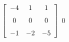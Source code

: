 {$\left[ \begin {array}{ccc} -4&1&1\\\noalign{\medskip}0&0&0
\\\noalign{\medskip}-1&-2&-5\end {array} \right]$} 
{$0$}



  

